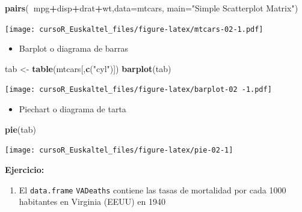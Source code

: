 \documentclass[]{book}
\newenvironment{Shaded}{\begin{snugshade}}{\end{snugshade}}
\newcommand{\KeywordTok}[1]{\textcolor[rgb]{0.13,0.29,0.53}{\textbf{#1}}}
\newcommand{\DataTypeTok}[1]{\textcolor[rgb]{0.13,0.29,0.53}{#1}}
\newcommand{\StringTok}[1]{\textcolor[rgb]{0.31,0.60,0.02}{#1}}
\newcommand{\OperatorTok}[1]{\textcolor[rgb]{0.81,0.36,0.00}{\textbf{#1}}}
\newcommand{\NormalTok}[1]{#1}
\providecommand{\tightlist}{%
  \setlength{\itemsep}{0pt}\setlength{\parskip}{0pt}}
\begin{document}
\begin{Shaded}
\begin{Highlighting}[]
\KeywordTok{pairs}\NormalTok{(}\OperatorTok{~}\NormalTok{mpg}\OperatorTok{+}\NormalTok{disp}\OperatorTok{+}\NormalTok{drat}\OperatorTok{+}\NormalTok{wt,}\DataTypeTok{data=}\NormalTok{mtcars,}
   \DataTypeTok{main=}\StringTok{"Simple Scatterplot Matrix"}\NormalTok{)}
\end{Highlighting}
\end{Shaded}

\texttt{[image: cursoR\_Euskaltel\_files/figure-latex/mtcars-02-1.pdf]}

\begin{itemize}
\tightlist
\item
  Barplot o diagrama de barras
\end{itemize}

\begin{Shaded}
\begin{Highlighting}[]
\NormalTok{tab <-}\StringTok{ }\KeywordTok{table}\NormalTok{(mtcars[,}\KeywordTok{c}\NormalTok{(}\StringTok{"cyl"}\NormalTok{)])}
\KeywordTok{barplot}\NormalTok{(tab)}
\end{Highlighting}
\end{Shaded}

\texttt{[image: cursoR\_Euskaltel\_files/figure-latex/barplot-02 -1.pdf]}

\begin{itemize}
\tightlist
\item
  Piechart o diagrama de tarta
\end{itemize}

\begin{Shaded}
\begin{Highlighting}[]
\KeywordTok{pie}\NormalTok{(tab)}
\end{Highlighting}
\end{Shaded}

\begin{center}\texttt{[image: cursoR\_Euskaltel\_files/figure-latex/pie-02-1]} \end{center}

\textbf{Ejercicio:}

\begin{enumerate}
\def\labelenumi{\arabic{enumi}.}
\tightlist
\item
  El \texttt{data.frame} \texttt{VADeaths} contiene las tasas de
  mortalidad por cada 1000 habitantes en Virginia (EEUU) en 1940
\end{enumerate}
\end{document}
